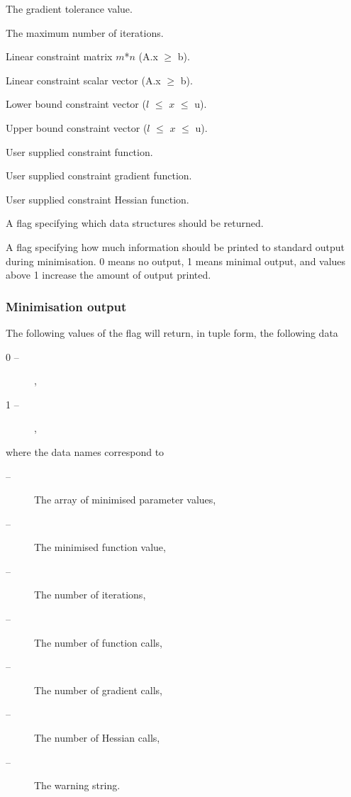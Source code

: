   The gradient tolerance value.

  The maximum number of iterations.

  Linear constraint  matrix $m$*$n$ (A.x $\ge$ b).

  Linear constraint  scalar vector (A.x $\ge$ b).

  Lower bound  constraint  vector ($l$ $\le$ $x$ $\le$ u).

  Upper bound  constraint  vector ($l$ $\le$ $x$ $\le$ u).

  User supplied constraint  function.

  User supplied constraint  gradient function.

  User supplied constraint  Hessian function.

  A flag specifying which data structures should be returned.

  A flag specifying how much information should be printed to standard output during minimisation.   0 means no output, 1 means minimal output, and values above 1 increase the amount of output printed.

\subsubsection{Minimisation output}

The following values of the 
 flag will return, in tuple form, the following data

\begin{description}
\item[    0 --]   
,
\item[    1 --]   
,
\end{description}

where the data names correspond to

\begin{description}
\item[    
 --]       The array of minimised  parameter values,
\item[    
 --]       The minimised  function value,
\item[    
 --]        The number of iterations,
\item[    
 --]  The number of function calls,
\item[    
 --]  The number of gradient calls,
\item[    
 --]  The number of Hessian calls,
\item[    
 --]  The warning string.
\end{description}


